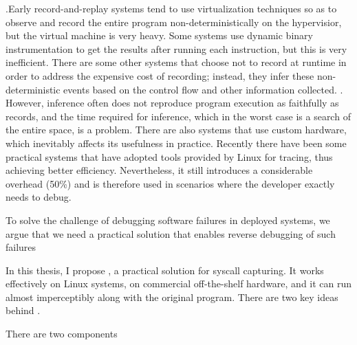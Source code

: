  .Early record-and-replay systems tend to use virtualization techniques so as to
observe and record the entire program non-deterministically on the hypervisior,
but the virtual machine is very heavy. \cite{dunlap_revirt_2003} Some systems
use dynamic binary instrumentation to get the results after running each
instruction, but this is very inefficient. \cite{bhansali_framework_2006} There
are some other systems that choose not to record at runtime in order to address
the expensive cost of recording; instead, they infer these non-deterministic
events based on the control flow and other information collected.
\cite{altekar_odr_2009,cui_rept_2018}. However, inference often does not
reproduce program execution as faithfully as records, and the time required for
inference, which in the worst case is a search of the entire space, is a
problem. There are also systems that use custom hardware, which inevitably
affects its usefulness in practice. Recently there have been some practical
systems that have adopted tools provided by Linux for tracing, thus achieving
better efficiency. Nevertheless, it still introduces a considerable overhead (50\%) and
is therefore used in scenarios where the developer exactly needs to
debug.\cite{203227}


To solve the challenge of debugging software failures in deployed systems, we argue that we need a practical solution that enables reverse debugging of such failures

In this thesis, I propose \TheName, a practical solution for syscall capturing. It works effectively on Linux systems, on commercial off-the-shelf hardware, and it can run almost imperceptibly along with the original program. There are two key ideas behind \TheName. 

There are two components 

